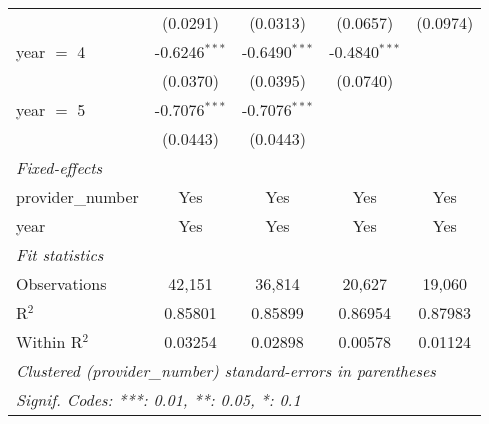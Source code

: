 \begin{tabular}{lcccc}
                     & (0.0291)        & (0.0313)        & (0.0657)        & (0.0974)\\   
   year $=$ 4        & -0.6246$^{***}$ & -0.6490$^{***}$ & -0.4840$^{***}$ &   \\   
                     & (0.0370)        & (0.0395)        & (0.0740)        &   \\   
   year $=$ 5        & -0.7076$^{***}$ & -0.7076$^{***}$ &                 &   \\   
                     & (0.0443)        & (0.0443)        &                 &   \\   
   \midrule
   \emph{Fixed-effects}\\
   provider\_number  & Yes             & Yes             & Yes             & Yes\\  
   year              & Yes             & Yes             & Yes             & Yes\\  
   \midrule
   \emph{Fit statistics}\\
   Observations      & 42,151          & 36,814          & 20,627          & 19,060\\  
   R$^2$             & 0.85801         & 0.85899         & 0.86954         & 0.87983\\  
   Within R$^2$      & 0.03254         & 0.02898         & 0.00578         & 0.01124\\  
   \midrule \midrule
   \multicolumn{5}{l}{\emph{Clustered (provider\_number) standard-errors in parentheses}}\\
   \multicolumn{5}{l}{\emph{Signif. Codes: ***: 0.01, **: 0.05, *: 0.1}}\\
\end{tabular}
\par\endgroup


